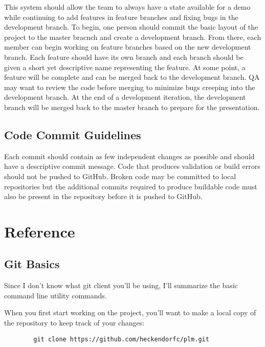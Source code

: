 \documentclass{article}
\begin{document}
	This system should allow the team to always have a state available for a demo while continuing to add features in feature branches and fixing bugs in the development branch. To begin, one person should commit the basic layout of the project to the master bracnch and create a development branch. From there, each member can begin working on feature branches based on the new development branch. Each feature should have its own branch and each branch should be given a short yet descriptive name representing the feature. At some point, a feature will be complete and can be merged back to the development branch. QA may want to review the code before merging to minimize bugs creeping into the development branch. At the end of a development iteration, the development branch will be merged back to the master branch to prepare for the presentation.

	\subsection {Code Commit Guidelines}

	Each commit should contain as few independent changes as possible and should have a descriptive commit message. Code that produces validation or build errors should not be pushed to GitHub. Broken code may be committed to local repositories but the additional commits required to produce buildable code must also be present in the repository before it is pushed to GitHub.

	\section{Reference}

	\subsection{Git Basics}

	Since I don't know what git client you'll be using, I'll summarize the basic command line utility commands.

	When you first start working on the project, you'll want to make a local copy of the repository to keep track of your changes:

	\begin{minipage}{0.95\textwidth}\begin{lstlisting}
	    git clone https://github.com/heckendorfc/plm.git
	\end{lstlisting}\end{minipage}
\end{document}

